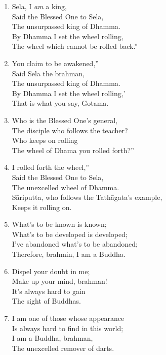 \documentclass[10pt, openany]{book}
\newcommand*{\vleftofline}[1]{\leavevmode\llap{#1}}
\begin{document}
\begin{enumerate}
\item \vleftofline{“}Sela, I \emph{am} a king,\\
Said the Blessed One to Sela,\\
\vleftofline{“}The unsurpassed king of Dhamma.\\
By Dhamma I set the wheel rolling,\\
The wheel which cannot be rolled back.”

\item \vleftofline{“}You claim to be awakened,”\\
Said Sela the brahman,\\
\vleftofline{“}The unsurpassed king of Dhamma.\\
\vleftofline{‘}By Dhamma I set the wheel rolling,’\\
That is what you say, Gotama.

\item Who is the Blessed One’s general,\\
The disciple who follows the teacher?\\
Who keeps on rolling\\
The wheel of Dhama you rolled forth?”

\item \vleftofline{“}I rolled forth the wheel,”\\
Said the Blessed One to Sela,\\
\vleftofline{“}The unexcelled wheel of Dhamma.\\
Sāriputta, who follows the Tathāgata’s example,\\
Keeps it rolling on.

\item What’s to be known is known;\\
What’s to be developed is developed;\\
I’ve abandoned what’s to be abandoned;\\
Therefore, brahmin, I am a Buddha.

\item Dispel your doubt in me;\\
Make up your mind, brahman!\\
It’s always hard to gain\\
The sight of Buddhas.

\item I am one of those whose appearance\\
Is always hard to find in this world;\\
I am a Buddha, brahman,\\
The unexcelled remover of darts.


\end{enumerate}
\end{document}
